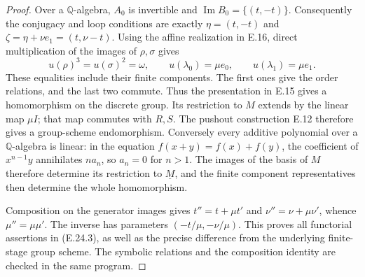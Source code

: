 \begin{proof}
Over a \(\mathbb Q\)-algebra, \(A_0\) is invertible and
\(\operatorname{Im}B_0=\{(t,-t)\}\).  Consequently the
conjugacy and loop conditions are exactly
\(\eta=(t,-t)\) and \(\zeta=\eta+\nu e_1=(t,\nu-t)\).
Using the affine realization in E.16, direct multiplication
of the images of \(\rho,\sigma\) gives
\[
 u(\rho)^3=u(\sigma)^2=\omega,
 \qquad u(\lambda_0)=\mu e_0,
 \qquad u(\lambda_1)=\mu e_1.
\]
These equalities include their finite components.  The first
ones give the order relations, and the last two commute.
Thus the presentation in E.15 gives a homomorphism on the
discrete group.  Its restriction to \(M\) extends by the
linear map \(\mu I\); that map commutes with \(R,S\).
The pushout construction E.12 therefore gives a group-scheme
endomorphism.  Conversely every additive polynomial over a
\(\mathbb Q\)-algebra is linear: in the equation
\(f(x+y)=f(x)+f(y)\), the coefficient of \(x^{n-1}y\)
annihilates \(na_n\), so \(a_n=0\) for \(n>1\).
The images of the basis of \(M\) therefore determine its
restriction to \(\underline M\), and the finite component
representatives then determine the whole homomorphism.

Composition on the generator images gives
\(t''=t+\mu t'\) and \(\nu''=\nu+\mu\nu'\), whence
\(\mu''=\mu\mu'\).  The inverse has parameters
\((-t/\mu,-\nu/\mu)\).  This proves all functorial assertions
in (E.24.3), as well as the precise difference from the
underlying finite-stage group scheme.  The symbolic relations
and the composition identity are checked in the same program.
\end{proof}

